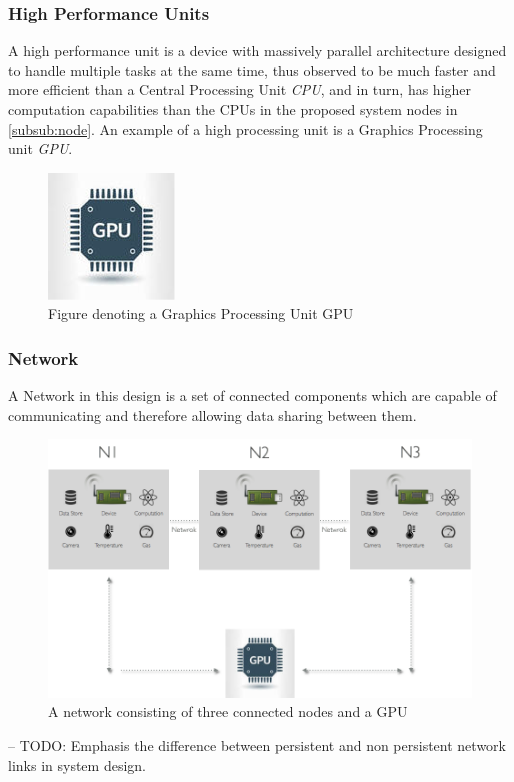 \subsubsection{High Performance  Units }

A high performance unit is a device with massively parallel architecture designed to handle multiple tasks at the same time, thus observed to be much faster and more efficient than a Central Processing Unit \textit{CPU}, and in turn, has higher computation capabilities than the CPUs in the proposed system nodes in \ref{subsub:node}. An example of a high processing unit is  a Graphics Processing unit \textit{GPU}.

\begin{figure}[H]
	\centering
	\includegraphics[scale=0.7]{images/gpu.png}
		\caption{Figure denoting a Graphics Processing Unit GPU}
	\label{fig:gpu}
\end{figure}

\subsubsection{Network}
\label{subsub:network}
A Network in this design is a set of connected components which are capable of communicating and therefore allowing data sharing between them.
\begin{figure}[H]
	\centering
	\includegraphics[scale=0.4]{images/network.png}
	\caption{A network consisting of three connected nodes and a GPU}
	\label{fig:network}
\end{figure}
-- TODO: 
Emphasis the difference between persistent and non persistent network links in system design.

